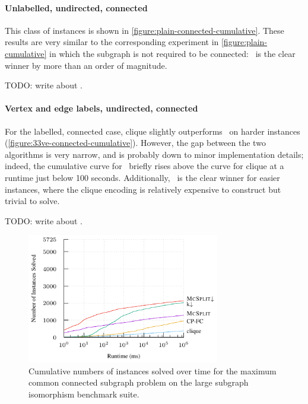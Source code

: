 \paragraph{Unlabelled, undirected, connected} This class of instances is shown
in \cref{figure:plain-connected-cumulative}.  These results are very similar to
the corresponding experiment in \cref{figure:plain-cumulative} in which the
subgraph is not required to be connected: \McSplit\ is the clear winner by more
than an order of magnitude.

TODO: write about \McSplitDown.

\paragraph{Vertex and edge labels, undirected, connected} For the labelled,
connected case, clique slightly outperforms \McSplit\ on harder instances
(\cref{figure:33ve-connected-cumulative}). However, the gap between the two algorithms
is very narrow, and is probably down to minor implementation details; indeed, the
cumulative curve for \McSplit\ briefly rises above the curve for clique at a
runtime just below 100 seconds. Additionally, \McSplit\ is the clear winner for
easier instances, where the clique encoding is relatively expensive to
construct but trivial to solve.

TODO: write about \McSplitDown.

\begin{figure}[h!]
    \centering
    \includegraphics*[width=0.75\textwidth]{14-mcsplit-i-undirected/img/gen-graph-sip-cumulative.pdf}
    \caption{Cumulative numbers of instances solved over time for the maximum
    common connected subgraph problem on the large subgraph isomorphism benchmark
    suite.} \label{figure:sip-cumulative}
\end{figure}

